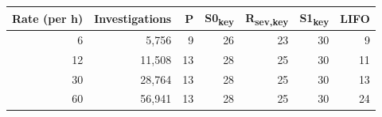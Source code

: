 \begin{tabular}{rrrrrrr}
\toprule
Rate (per h) & Investigations & P & S0\textsubscript{key} & R\textsubscript{sev,key} & S1\textsubscript{key} & LIFO \\
\midrule
6 & 5,756 & 9 & 26 & 23 & 30 & 9 \\
12 & 11,508 & 13 & 28 & 25 & 30 & 11 \\
30 & 28,764 & 13 & 28 & 25 & 30 & 13 \\
60 & 56,941 & 13 & 28 & 25 & 30 & 24 \\
\bottomrule
\end{tabular}
